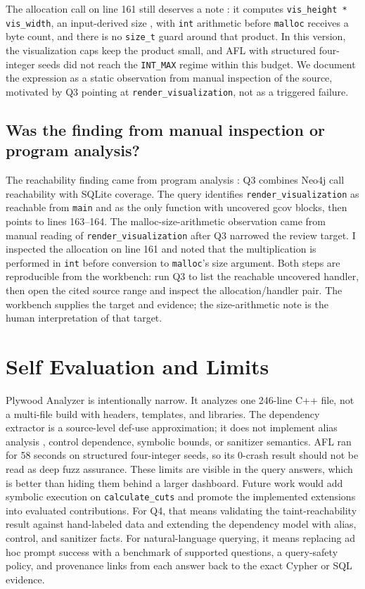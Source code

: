 \documentclass[11pt,twocolumn]{article}
\begin{document}
The allocation call on line 161 still deserves a note \cite{pearce,lostatc}: it
computes \texttt{vis\_height * vis\_width}, an input-derived size
\cite{newsome}, with \texttt{int} arithmetic before
\texttt{malloc} receives a byte count, and there is no \texttt{size\_t} guard
around that product. In this version, the visualization caps keep the product
small, and AFL with structured four-integer seeds did not reach the
\texttt{INT\_MAX} regime within this budget. We document the expression as a
static observation from manual inspection of the source, motivated by Q3
pointing at \texttt{render\_visualization}, not as a triggered failure.

\subsection{Was the finding from manual inspection or program analysis?}

The reachability finding came from program analysis \cite{coverity}: Q3 combines
Neo4j call reachability with SQLite coverage. The query identifies
\texttt{render\_visualization} as
reachable from \texttt{main} and as the only function with uncovered gcov
blocks, then points to lines 163--164. The malloc-size-arithmetic observation
came from manual reading of \texttt{render\_visualization} after Q3 narrowed
the review target. I inspected the allocation on line 161 and noted that the
multiplication is performed in \texttt{int} before conversion to
\texttt{malloc}'s size argument. Both steps are reproducible from the
workbench: run Q3 to list the reachable uncovered handler, then open the cited
source range and inspect the allocation/handler pair. The workbench supplies
the target and evidence; the size-arithmetic note is the human interpretation
of that target.

\section{Self Evaluation and Limits}

Plywood Analyzer is intentionally narrow. It analyzes one 246-line C++ file,
not a multi-file build with headers, templates, and libraries. The dependency
extractor is a source-level def-use approximation; it does not implement alias
analysis \cite{andersen}, control dependence, symbolic bounds, or sanitizer
semantics. AFL ran
for 58 seconds on structured four-integer seeds, so its 0-crash result should
not be read as deep fuzz assurance. These limits are visible in the query
answers, which is better than hiding them behind a larger dashboard.
Future work would add symbolic execution on \texttt{calculate\_cuts} \cite{klee}
and promote the implemented extensions into evaluated contributions. For Q4,
that means validating the taint-reachability result against hand-labeled data
and extending the dependency model with alias, control, and sanitizer facts. For
natural-language querying, it means replacing ad hoc prompt success with a
benchmark of supported questions, a query-safety policy, and provenance links
from each answer back to the exact Cypher or SQL evidence.
\end{document}
